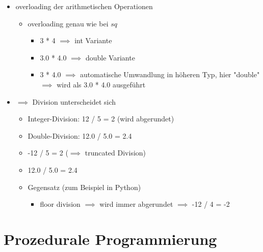 \documentclass[a4paper]{scrartcl}
\theoremstyle{definition}
\theoremstyle{plain}
\theoremstyle{remark}
\theoremstyle{remark}
\begin{document}
\begin{itemize}
\begin{itemize}
\begin{itemize}
\begin{itemize}
\begin{verbatim}
#include <iostream>
#include <string>
int main() {
	std::cout << "Hello, world!" << std::endl;
	std::string out = "mein erstes Programm\n";
	std::cout << out;
	return 0;
}
\end{verbatim}
\end{itemize}
\end{itemize}
\item overloading der arithmetischen Operationen
\begin{itemize}
\item overloading genau wie bei $sq$
\begin{itemize}
\item 3 * 4 $\implies$ int Variante
\item 3.0 * 4.0 $\implies$ double Variante
\item 3 * 4.0 $\implies$ automatische Umwandlung in höheren Typ, hier "double" $\implies$ wird als 3.0 * 4.0 ausgeführt
\end{itemize}
\end{itemize}
\item $\implies$ Division unterscheidet sich
\begin{itemize}
\item Integer-Division: 12 / 5 = 2 (wird abgerundet)
\item Double-Division: 12.0 / 5.0 = 2.4
\item -12 / 5 = 2 ($\implies$ truncated Division)
\item 12.0 / 5.0 = 2.4
\item Gegensatz (zum Beispiel in Python)
\begin{itemize}
\item floor division $\implies$ wird immer abgerundet $\implies$ -12 / 4 = -2
\end{itemize}
\end{itemize}
\end{itemize}
\end{itemize}
\section{Prozedurale Programmierung}
\label{sec-7}
\end{document}
